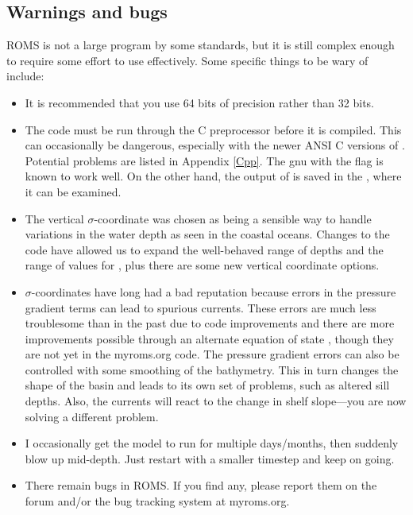 \subsection{Warnings and bugs}
ROMS is not a large program by some standards, but it is still complex
enough to require some effort to use effectively.
Some specific things to be wary of include:
\begin{itemize}
  \item It is recommended that you use 64 bits of precision rather
than 32 bits.
  \item The code must be run through the C preprocessor before it
is compiled.  This can occasionally be dangerous, especially with
the newer ANSI C versions of .  Potential problems are listed
in Appendix \ref{Cpp}. The gnu  with the  flag
is known to work well. On the other hand, the output of  is
saved in the , where it can be examined.
  \item The vertical $\sigma$-coordinate was chosen as being a sensible
way to handle variations in the water depth as seen in the coastal
oceans. Changes to the code have allowed us to expand the well-behaved
range of depths and the range of values for , plus there
are some new vertical coordinate options.
  \item $\sigma$-coordinates have long had a bad reputation
because errors in the pressure gradient terms can lead to spurious
currents. These errors are much less troublesome than in the past due
to code improvements and there are more improvements possible
through an alternate equation of state \citep{SS2008c}, though
they are not yet in the myroms.org code. The pressure gradient
errors can also be controlled with some smoothing
of the bathymetry. This in turn changes the shape of the basin and
leads to its own set of problems, such as altered sill depths. Also, the
currents will react to the change in shelf slope---you are now solving a
different problem.
  \item I occasionally get the model to run for multiple
days/months, then suddenly blow up mid-depth. Just restart with a
smaller timestep and keep on going.
  \item There remain bugs in ROMS. If you find any, please report
them on the forum and/or the bug tracking system at myroms.org.
\end{itemize}

